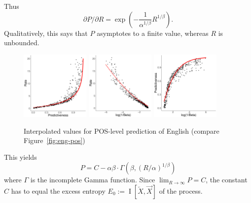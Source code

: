 \documentclass[11pt,letterpaper]{article}
\newif \ifcomment
\newcommand\rljf[1]{\ifcomment{{\color{blue}(#1)}}\else{}\fi}
\begin{document}
Thus
\begin{equation}\label{eq:derivatives}
	\partial P/\partial R = \exp\left(-\frac{1}{\alpha^{1/\beta}} R^{1/\beta}\right). %
\end{equation}
Qualitatively, this says that $P$ asymptotes to a finite value, whereas $R$ is unbounded. \rljf{Exactly the opposite of Dembowski's finding}



\begin{figure}
\includegraphics[width=0.3\textwidth]{code/figures/english-info-fitted.pdf}
\includegraphics[width=0.3\textwidth]{code/figures/english-logbeta-mem-fitted.pdf}
	\includegraphics[width=0.3\textwidth]{code/figures/english-nlogbeta-ee-fitted.pdf}
	\caption{Interpolated values for POS-level prediction of English (compare Figure~\ref{fig:eng-pos})}\label{fig:eng-pos-fitted}
\end{figure}

This yields
\begin{equation}
	P = C - \alpha\beta \cdot \Gamma\left(\beta, (R/\alpha)^{1/\beta}\right)
\end{equation}
where $\Gamma$ is the incomplete Gamma function.
Since $\lim_{R \rightarrow \infty} P = C$, the constant $C$ has to equal the excess entropy $E_0 := \operatorname{I}[\overleftarrow{X}, \overrightarrow{X}]$ of the process.
\end{document}
